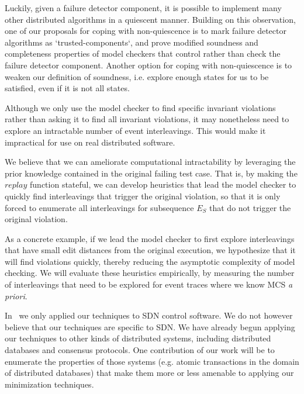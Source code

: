 Luckily, given a failure detector component, it is possible to implement many other
distributed algorithms in a quiescent manner. Building on this observation,
one of our proposals for coping with non-quiescence is to mark failure detector algorithms as `trusted-components`,
and prove modified soundness and completeness properties of model checkers that control rather than check the failure detector component.
Another option for coping with non-quiescence is to weaken our definition of soundness,
i.e. explore enough states for us to be satisfied, even if it is not all states.

 Although we only use the
model checker to find specific invariant violations rather than asking it to
find all invariant violations, it may nonetheless need to explore an
intractable number of event interleavings. This would make it impractical for
use on real distributed software.

We believe that we can ameliorate computational intractability by
leveraging the prior knowledge contained in the original failing test case.
That is, by making the $replay$ function stateful, we can develop heuristics that lead the
model checker to quickly find interleavings that trigger the original violation, so that
it is only forced to enumerate all interleavings for subsequence $E_S$ that do
not trigger the original violation.

As a concrete example, if we lead
the model checker to first explore interleavings that have small edit
distances from the original execution, we hypothesize that it will find
violations quickly, thereby reducing the asymptotic complexity of model
checking. We will evaluate these heuristics empirically, by measuring the number of
interleavings that need to be explored for event traces where we know
MCS {\em a priori}.

 In~\cite{sts2014} we
only applied our techniques to SDN control software. We do not however believe
that our techniques are specific to SDN. We have already begun applying our
techniques to other kinds of distributed systems, including distributed
databases and consensus protocols. One contribution of our work will be to
enumerate the properties of those systems (e.g. atomic transactions in the
domain of distributed databases) that make them more or less amenable to
applying our minimization techniques.






